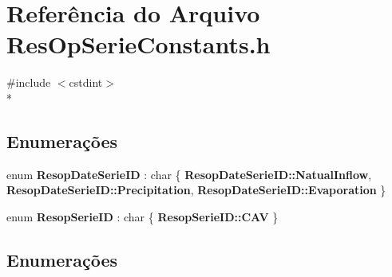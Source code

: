 \section{Referência do Arquivo Res\+Op\+Serie\+Constants.\+h}
\label{_res_op_serie_constants_8h}
{\ttfamily \#include $<$cstdint$>$}\\*
\subsection*{Enumerações}
\begin{DoxyCompactItemize}
\item 
enum {\bf Resop\+Date\+Serie\+ID} \+: char \{ {\bf Resop\+Date\+Serie\+I\+D\+::\+Natual\+Inflow}, 
{\bf Resop\+Date\+Serie\+I\+D\+::\+Precipitation}, 
{\bf Resop\+Date\+Serie\+I\+D\+::\+Evaporation}
 \}
\item 
enum {\bf Resop\+Serie\+ID} \+: char \{ {\bf Resop\+Serie\+I\+D\+::\+C\+AV}
 \}
\end{DoxyCompactItemize}


\subsection{Enumerações}
